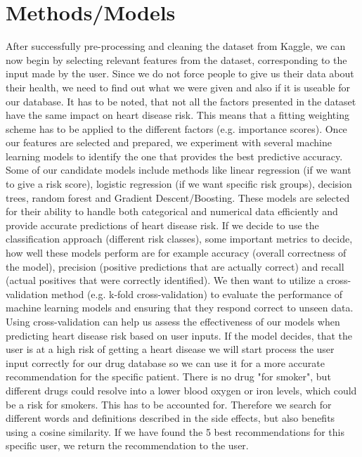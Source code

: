 \documentclass{article}
\begin{document}
\section{Methods/Models}
After successfully pre-processing and cleaning the dataset from Kaggle, we can now begin by selecting relevant features from the dataset, corresponding to the input made by the user. Since we do not force people to give us their data about their health, we need to find out what we were given and also if it is useable for our database. It has to be noted, that not all the factors presented in the dataset have the same impact on heart disease risk. This means that a fitting weighting scheme has to be applied to the different factors (e.g. importance scores). Once our features are selected and prepared, we experiment with several machine learning models to identify the one that provides the best predictive accuracy. Some of our candidate models include methods like linear regression (if we want to give a risk score), logistic regression (if we want specific risk groups), decision trees, random forest and Gradient Descent/Boosting. These models are selected for their ability to handle both categorical and numerical data efficiently and provide accurate predictions of heart disease risk. If we decide to use the classification approach (different risk classes), some important metrics to decide, how well these models perform are for example accuracy (overall correctness of the model), precision (positive predictions that are actually correct) and recall (actual positives that were correctly identified). We then want to utilize a cross-validation method (e.g. k-fold cross-validation) to evaluate the performance of machine learning models and ensuring that they respond correct to unseen data. Using cross-validation can help us assess the effectiveness of our models when predicting heart disease risk based on user inputs. If the model decides, that the user is at a high risk of getting a heart disease we will start process the user input correctly for our drug database so we can use it for a more accurate recommendation for the specific patient. There is no drug "for smoker", but different drugs could resolve into a lower blood oxygen or iron levels, which could be a risk for smokers. This has to be accounted for. Therefore we search for different words and definitions described in the side effects, but also benefits using a cosine similarity. If we have found the 5 best recommendations for this specific user, we return the recommendation to the user. 
\end{document}

